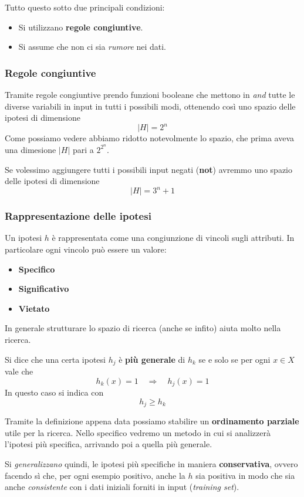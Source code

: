 Tutto questo sotto due principali condizioni:
\begin{itemize}
	\item Si utilizzano \textbf{regole congiuntive}.
	\item Si assume che non ci sia \emph{rumore} nei dati.
\end{itemize}

\subsubsection{Regole congiuntive}
Tramite regole congiuntive prendo funzioni booleane che mettono in \emph{and} tutte le diverse variabili in input in tutti
i possibili modi, ottenendo cos\`i uno spazio delle ipotesi di dimensione
\[ |H| = 2^n \]
Come possiamo vedere abbiamo ridotto notevolmente lo spazio, che prima aveva una dimesione $|H|$ pari a $2^{2^n}$.

Se volessimo aggiungere tutti i possibili input negati (\textbf{not}) avremmo uno spazio delle ipotesi di dimensione
\[ |H| = 3^n + 1 \]

\subsubsection{Rappresentazione delle ipotesi}
Un ipotesi $h$ \`e rappresentata come una congiunzione di vincoli sugli attributi. In particolare ogni vincolo pu\`o
essere un valore:
\begin{itemize}
	\item \textbf{Specifico}
	\item \textbf{Significativo}
	\item \textbf{Vietato}
\end{itemize}
In generale strutturare lo spazio di ricerca (anche se infito) aiuta molto nella ricerca.

\begin{definition}
	Si dice che una certa ipotesi $h_j$ \`e \textbf{pi\`u generale} di $h_k$ se e solo se per ogni $x \in X$ vale che
	\[ h_k(x) = 1 \quad \Rightarrow \quad h_j(x) = 1 \]
	In questo caso si indica con
	\[ h_j \geq h_k \]
\end{definition}

Tramite la definizione appena data possiamo stabilire un \textbf{ordinamento parziale} utile per la ricerca.
Nello specifico vedremo un metodo in cui si analizzer\`a l'ipotesi pi\`u specifica, arrivando poi a quella pi\`u generale.

Si \emph{generalizzano} quindi, le ipotesi pi\`u specifiche in maniera \textbf{conservativa}, ovvero facendo s\`i che, per
ogni esempio positivo, anche la $h$ sia positiva in modo che sia anche \emph{consistente} con i dati iniziali forniti in
input (\emph{training set}).

